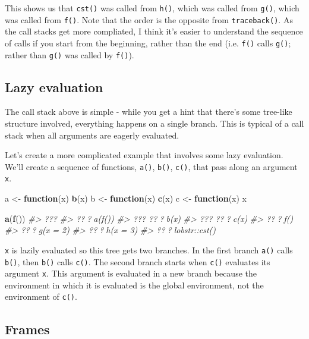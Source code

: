 \documentclass[]{book}
\newenvironment{Shaded}{\begin{snugshade}}{\end{snugshade}}
\newcommand{\KeywordTok}[1]{\textcolor[rgb]{0.13,0.29,0.53}{\textbf{#1}}}
\newcommand{\StringTok}[1]{\textcolor[rgb]{0.31,0.60,0.02}{#1}}
\newcommand{\CommentTok}[1]{\textcolor[rgb]{0.56,0.35,0.01}{\textit{#1}}}
\newcommand{\ControlFlowTok}[1]{\textcolor[rgb]{0.13,0.29,0.53}{\textbf{#1}}}
\newcommand{\NormalTok}[1]{#1}
\theoremstyle{definition}
\theoremstyle{definition}
\theoremstyle{definition}
\theoremstyle{remark}
\begin{document}
This shows us that \texttt{cst()} was called from \texttt{h()}, which
was called from \texttt{g()}, which was called from \texttt{f()}. Note
that the order is the opposite from \texttt{traceback()}. As the call
stacks get more compliated, I think it's easier to understand the
sequence of calls if you start from the beginning, rather than the end
(i.e. \texttt{f()} calls \texttt{g()}; rather than \texttt{g()} was
called by \texttt{f()}).

\subsection{Lazy evaluation}\label{lazy-evaluation}

The call stack above is simple - while you get a hint that there's some
tree-like structure involved, everything happens on a single branch.
This is typical of a call stack when all arguments are eagerly
evaluated.

Let's create a more complicated example that involves some lazy
evaluation. We'll create a sequence of functions, \texttt{a()},
\texttt{b()}, \texttt{c()}, that pass along an argument \texttt{x}.

\begin{Shaded}
\begin{Highlighting}[]
\NormalTok{a <-}\StringTok{ }\ControlFlowTok{function}\NormalTok{(x) }\KeywordTok{b}\NormalTok{(x)}
\NormalTok{b <-}\StringTok{ }\ControlFlowTok{function}\NormalTok{(x) }\KeywordTok{c}\NormalTok{(x)}
\NormalTok{c <-}\StringTok{ }\ControlFlowTok{function}\NormalTok{(x) x}

\KeywordTok{a}\NormalTok{(}\KeywordTok{f}\NormalTok{())}
\CommentTok{#> ???}
\CommentTok{#> ???a(f())}
\CommentTok{#> ??? ???b(x)}
\CommentTok{#> ???   ???c(x)}
\CommentTok{#> ???f()}
\CommentTok{#>   ???g(x = 2)}
\CommentTok{#>     ???h(x = 3)}
\CommentTok{#>       ???lobstr::cst()}
\end{Highlighting}
\end{Shaded}

\texttt{x} is lazily evaluated so this tree gets two branches. In the
first branch \texttt{a()} calls \texttt{b()}, then \texttt{b()} calls
\texttt{c()}. The second branch starts when \texttt{c()} evaluates its
argument \texttt{x}. This argument is evaluated in a new branch because
the environment in which it is evaluated is the global environment, not
the environment of \texttt{c()}.

\subsection{Frames}\label{frames}
\end{document}
